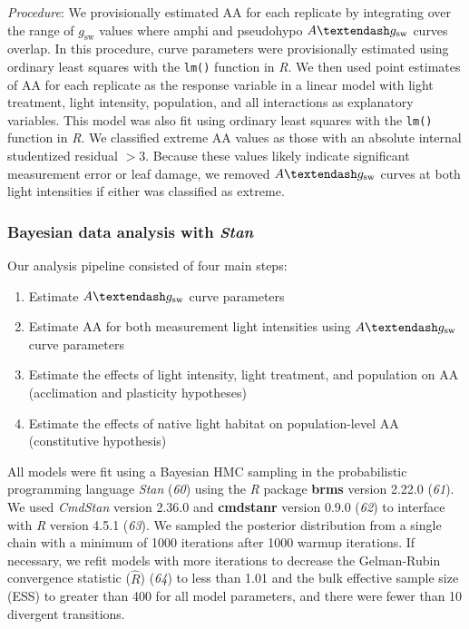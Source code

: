 \documentclass[
  letterpaper,
  DIV=11,
  numbers=noendperiod]{scrartcl}
\providecommand{\tightlist}{%
  \setlength{\itemsep}{0pt}\setlength{\parskip}{0pt}}\usepackage{longtable,booktabs,array}
\newcommand{\aax}{$\mathrm{AA}$}
\newcommand{\agcurve}{$A \textendash g_\text{sw}$}
\newcommand{\gsw}{$g_\text{sw}$}
\begin{document}
\emph{Procedure}: We provisionally estimated \aax{} for each replicate
by integrating over the range of \gsw{} values where amphi and
pseudohypo \agcurve{} curves overlap. In this procedure, curve
parameters were provisionally estimated using ordinary least squares
with the \texttt{lm()} function in \emph{R}. We then used point
estimates of \aax{} for each replicate as the response variable in a
linear model with light treatment, light intensity, population, and all
interactions as explanatory variables. This model was also fit using
ordinary least squares with the \texttt{lm()} function in \emph{R}. We
classified extreme \aax{} values as those with an absolute internal
studentized residual \(> 3\). Because these values likely indicate
significant measurement error or leaf damage, we removed \agcurve{}
curves at both light intensities if either was classified as extreme.

\subsubsection{\texorpdfstring{Bayesian data analysis with
\emph{Stan}}{Bayesian data analysis with Stan}}\label{sec-analysis}

Our analysis pipeline consisted of four main steps:

\begin{enumerate}
\def\labelenumi{\arabic{enumi}.}
\tightlist
\item
  Estimate \agcurve{} curve parameters
\item
  Estimate \aax{} for both measurement light intensities using
  \agcurve{} curve parameters
\item
  Estimate the effects of light intensity, light treatment, and
  population on \aax{} (acclimation and plasticity hypotheses)
\item
  Estimate the effects of native light habitat on population-level
  \aax{} (constitutive hypothesis)
\end{enumerate}

All models were fit using a Bayesian HMC sampling in the probabilistic
programming language \emph{Stan} (\emph{60}) using the \emph{R} package
\textbf{brms} version 2.22.0 (\emph{61}). We used \emph{CmdStan} version
2.36.0 and \textbf{cmdstanr} version 0.9.0 (\emph{62}) to interface with
\emph{R} version 4.5.1 (\emph{63}). We sampled the posterior
distribution from a single chain with a minimum of 1000 iterations after
1000 warmup iterations. If necessary, we refit models with more
iterations to decrease the Gelman-Rubin convergence statistic
(\(\hat{R}\)) (\emph{64}) to less than 1.01 and the bulk effective
sample size (ESS) to greater than 400 for all model parameters, and
there were fewer than 10 divergent transitions.
\end{document}
